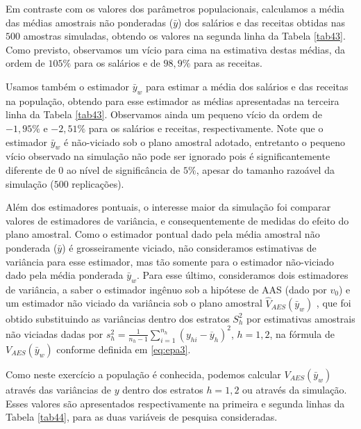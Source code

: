 \documentclass[]{book}
\numberwithin{example}{chapter}
\numberwithin{remark}{chapter}
\numberwithin{definition}{chapter}
\begin{document}
Em contraste com os valores dos parâmetros populacionais, calculamos a
média das médias amostrais não ponderadas (\(\bar{y}\)) dos salários e
das receitas obtidas nas \(500\) amostras simuladas, obtendo os valores
na segunda linha da Tabela \ref{tab43}. Como previsto, observamos um
vício para cima na estimativa destas médias, da ordem de \(105\%\) para
os salários e de \(98,9\%\) para as receitas.

Usamos também o estimador \(\bar{y}_{w}\) para estimar a média dos
salários e das receitas na população, obtendo para esse estimador as
médias apresentadas na terceira linha da Tabela \ref{tab43}. Observamos
ainda um pequeno vício da ordem de \(-1,95\%\) e \(-2,51\%\) para os
salários e receitas, respectivamente. Note que o estimador
\(\bar{y}_{w}\) é não-viciado sob o plano amostral adotado, entretanto o
pequeno vício observado na simulação não pode ser ignorado pois é
significantemente diferente de \(0\) ao nível de significância de
\(5\%\), apesar do tamanho razoável da simulação (\(500\) replicações).

Além dos estimadores pontuais, o interesse maior da simulação foi
comparar valores de estimadores de variância, e consequentemente de
medidas do efeito do plano amostral. Como o estimador pontual dado pela
média amostral não ponderada (\(\bar{y}\)) é grosseiramente viciado, não
consideramos estimativas de variância para esse estimador, mas tão
somente para o estimador não-viciado dado pela média ponderada
\(\bar{y}_{w}\). Para esse último, consideramos dois estimadores de
variância, a saber o estimador ingênuo sob a hipótese de AAS (dado por
\(v_{0}\)) e um estimador não viciado da variância sob o plano amostral
\(\hat{V}_{AES}\left( \bar{y}_{w}\right)\) , que foi obtido substituindo
as variâncias dentro dos estratos \(S_{h}^{2}\) por estimativas
amostrais não viciadas dadas por
\(s_{h}^{2}=\frac{1}{n_{h}-1}\sum_{i=1}^{n_{h}}(y_{hi}-\overline{y}_{h})^{2}\),
\(h=1,2\), na fórmula de \(V_{AES}\left( \bar{y}_{w}\right)\) conforme
definida em \eqref{eq:epa3}.

Como neste exercício a população é conhecida, podemos calcular
\(V_{AES}\left(\bar{y}_{w}\right)\) através das variâncias de \(y\)
dentro dos estratos \(h=1,2\) ou através da simulação. Esses valores são
apresentados respectivamente na primeira e segunda linhas da Tabela
\ref{tab44}, para as duas variáveis de pesquisa consideradas.
\end{document}

